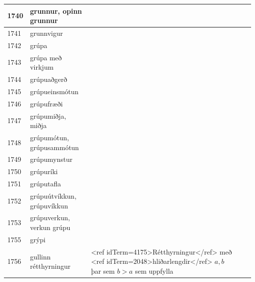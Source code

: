 \begin{longtable}{p{}|p{}|p{}|p{}|p{}}
\hline
1740 & grunnur, opinn grunnur &  &  &  \\
\hline
1741 & grunnvigur &  &  &  \\
\hline
1742 & grúpa &  &  &  \\
\hline
1743 & grúpa með virkjum &  &  &  \\
\hline
1744 & grúpuaðgerð &  &  &  \\
\hline
1745 & grúpueinsmótun &  &  &  \\
\hline
1746 & grúpufræði &  &  &  \\
\hline
1747 & grúpumiðja, miðja &  &  &  \\
\hline
1748 & grúpumótun, grúpusammótun &  &  &  \\
\hline
1749 & grúpumynstur &  &  &  \\
\hline
1750 & grúpuríki &  &  &  \\
\hline
1751 & grúputafla &  &  &  \\
\hline
1752 & grúpuútvíkkun, grúpuvíkkun &  &  &  \\
\hline
1753 & grúpuverkun, verkun grúpu &  &  &  \\
\hline
1755 & grýpi &  &  &  \\
\hline
1756 & gullinn rétthyrningur & <ref idTerm=4175>Rétthyrningur</ref> með <ref idTerm=2048>hliðarlengdir</ref> $a,b$ þar sem $b > a$ sem uppfylla


\end{longtable}
